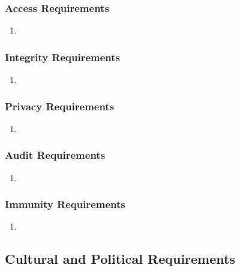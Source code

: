 \documentclass[]{article}
\begin{document}
\subsubsection{Access Requirements}
\label{ssub:access_requirements}
\begin{enumerate}[label={SR-AC\arabic*.}]
    \item 
\end{enumerate}

\subsubsection{Integrity Requirements}
\label{ssub:integrity_requirements}
\begin{enumerate}[label={SR-INT\arabic*.}]
    \item 
\end{enumerate}

\subsubsection{Privacy Requirements}
\label{ssub:privacy_requirements}
\begin{enumerate}[label={SR-P\arabic*.}]
    \item 
\end{enumerate}

\subsubsection{Audit Requirements}
\label{ssub:audit_requirements}
\begin{enumerate}[label={SR-AU\arabic*.}]
    \item 
\end{enumerate}

\subsubsection{Immunity Requirements}
\label{ssub:immunity_requirements}
\begin{enumerate}[label={SR-IM\arabic*.}]
    \item 
\end{enumerate}


\subsection{Cultural and Political Requirements}
\label{sub:cultural_and_political_requirements}
\end{document}
